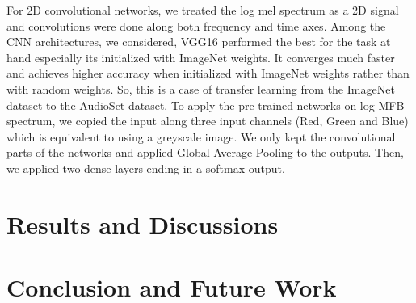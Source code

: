 \documentclass{article}
\begin{document}
For 2D convolutional networks, we treated the log mel spectrum as a 2D signal and convolutions were done along both frequency and time axes. Among the CNN architectures, we considered, VGG16 \cite{Simonyan2014} performed the best for the task at hand especially its initialized with ImageNet weights. It converges much faster and achieves higher accuracy when initialized with ImageNet weights rather than with random weights. So, this is a case of transfer learning \cite{Oquab2014} from the ImageNet dataset to the AudioSet dataset.
To apply the pre-trained networks on log MFB spectrum, we copied the input along three input channels (Red, Green and Blue) which is equivalent to using a greyscale image. We only kept the convolutional parts of the networks and applied Global Average Pooling to the outputs. Then, we applied two dense layers ending in a softmax output.

\section{Results and Discussions}





\section{Conclusion and Future Work}


\printbibliography
\end{document}
